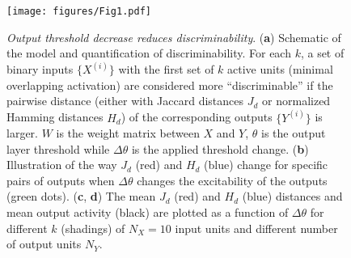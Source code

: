 
\begin{figure}[ht]
    \centering
    \texttt{[image: figures/Fig1.pdf]}
    \caption{
    \textit{Output threshold decrease reduces discriminability}.
    (\textbf{a}) Schematic of the model and quantification of discriminability.
        For each $k$, a set of binary inputs $\{X^{(i)}\}$ with the first set of $k$ active units
            (minimal overlapping activation) are considered more ``discriminable''
        if the pairwise distance (either with Jaccard distances $J_d$ or normalized Hamming distances $H_d$)
            of the corresponding outputs $\{Y^{(i)}\}$ is larger.
        $W$ is the weight matrix between $X$ and $Y$, $\theta$ is the output layer threshold
            while $\Delta \theta$ is the applied threshold change.
    (\textbf{b}) Illustration of the way $J_d$ (red) and $H_d$ (blue) change for specific pairs of outputs
        when $\Delta \theta$ changes the excitability of the outputs (green dots).
    (\textbf{c}, \textbf{d}) The mean $J_d$ (red) and $H_d$ (blue) distances and mean output activity (black) are plotted
        as a function of $\Delta \theta$ for different $k$ (shadings)
        of $N_X = 10$ input units and different number of output units $N_Y$.
    }
    \label{fig:discrim}
\end{figure}